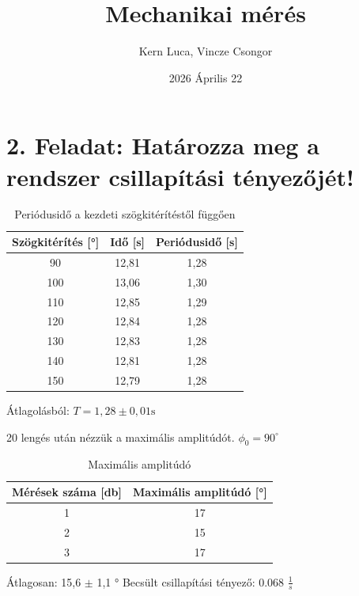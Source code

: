 \documentclass{article}
\title{Mechanikai mérés}
\author{Kern Luca, Vincze Csongor}
\date{2026 Április 22}
\begin{document}
\maketitle

\section*{2. Feladat: Határozza meg a rendszer csillapítási tényezőjét!}

\begin{table}[H]
    \centering
    \begin{tabular}{|c|c|c|}
        \hline
        Szögkitérítés [°] & Idő [s] & Periódusidő [s] \\ \hline
        90 & 12,81 & 1,28\\ \hline 
        100 & 13,06 & 1,30\\ \hline
        110 & 12,85 & 1,29\\ \hline 
        120 & 12,84 & 1,28\\ \hline
        130 & 12,83 & 1,28\\ \hline 
        140 & 12,81 & 1,28\\ \hline
        150 & 12,79&  1,28\\ \hline 

        
    \end{tabular}
    \caption{Periódusidő a kezdeti szögkitérítéstől függően}
    \label{tab:periodusido}
\end{table}

Átlagolásból: $T = 1,28 \pm 0,01 \text{s}$

20 lengés után nézzük a maximális amplitúdót.
$\phi_0 = 90^\circ$

\begin{table}[H]
    \centering
    \begin{tabular}{|c|c|}
        \hline
        Mérések száma [db] & Maximális amplitúdó [°] \\ \hline
         1 & 17 \\ \hline 
         2 & 15 \\ \hline
         3 & 17 \\ \hline 
        
    \end{tabular}
    \caption{Maximális amplitúdó}
    \label{tab:max_amplitudo}
\end{table}

Átlagosan: 15,6 $\pm$ 1,1 $\text{°}$
Becsült csillapítási tényező: 0.068 $\frac{1}{s}$
\end{document}
